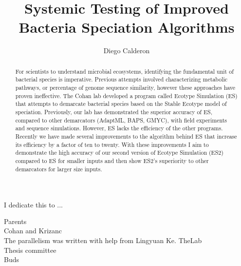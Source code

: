 \documentclass[11pt, final]{westhesis}
\title{Systemic Testing of Improved Bacteria Speciation Algorithms}
\author{Diego Calderon}
\begin{document}

\begin{dedication}
I dedicate this to ...
\end{dedication}

\begin{acknowledgements}
Parents \\
Cohan and Krizanc \\
The parallelism was written with help from Lingyuan Ke.
TheLab \\
Thesis committee \\
Buds \\
%
\end{acknowledgements}

\begin{abstract}
For scientists to understand microbial ecosystems, identifying the fundamental unit of bacterial species is imperative.
Previous attempts involved characterizing metabolic pathways, or percentage of genome sequence similarity, however these approaches have proven ineffective.
The Cohan lab developed a program called Ecotype Simulation (ES) that attempts to demarcate bacterial species based on the Stable Ecotype model of speciation.
Previously, our lab has demonstrated the superior accuracy of ES, compared to other demarcators (AdaptML, BAPS, GMYC), with field experiments and sequence simulations.
However, ES lacks the efficiency of the other programs.
Recently we have made several improvements to the algorithm behind ES that increase its efficiency by a factor of ten to twenty.
With these improvements I aim to demonstrate the high accuracy of our second version of Ecotype Simulation (ES2) compared to ES for smaller inputs and then show ES2's superiority to other demarcators for larger size inputs.

\end{abstract}

\frontmatter
\maketitle
\makeack
\makeabstract
\tableofcontents
\listoffigures
\listoftables
\end{document}
